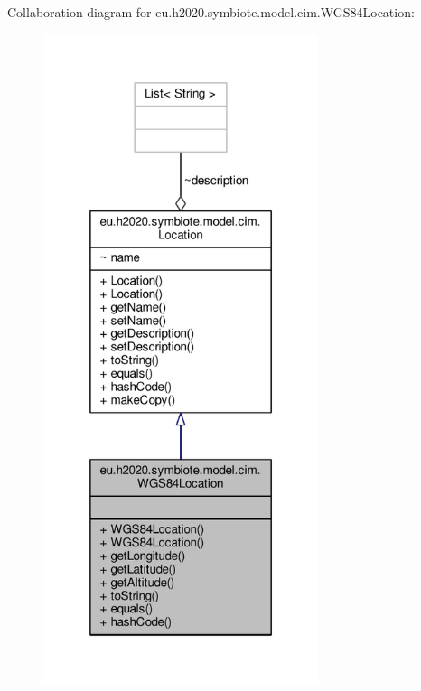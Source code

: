 Collaboration diagram for eu.\+h2020.\+symbiote.\+model.\+cim.\+W\+G\+S84\+Location\+:\nopagebreak
\begin{figure}[H]
\begin{center}
\leavevmode
\includegraphics[width=228pt]{classeu_1_1h2020_1_1symbiote_1_1model_1_1cim_1_1WGS84Location__coll__graph}
\end{center}
\end{figure}

